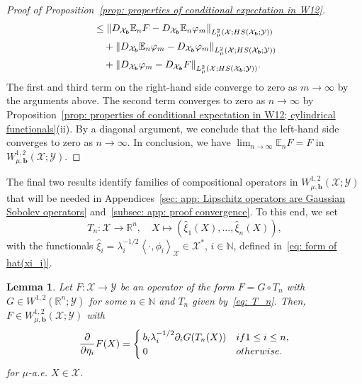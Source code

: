 \documentclass[namedate,webpdf]{ima-authoring-template-blank}
\newcommand*{\HS}{\textup{HS}}
\newcommand*{\nm}[1]{{\left\|#1\right \|}}
\newcommand*{\ip}[2]{\left\langle #1, #2 \right\rangle}
\newcounter{counter}
\numberwithin{counter}{section}
\numberwithin{equation}{section}
\theoremstyle{plain}
\newtheorem{lemma}[counter]{Lemma}
\theoremstyle{definition}
\newcommand*{\cX}{\mathcal{X}}
\newcommand*{\cY}{\mathcal{Y}}
\newcommand*{\bbE}{\mathbb{E}}
\newcommand*{\bbN}{\mathbb{N}}
\newcommand*{\bbR}{\mathbb{R}}
\theoremstyle{thmstyletwo}
\begin{document}
\begin{proof}[Proof of Proposition~\ref{prop: properties of conditional expectation in W12}]
\begin{align*}
        &\leq \nm{D_{\cX_{\bm{b}}} \bbE_n F - D_{\cX_{\bm{b}}} \bbE_n \varphi_m}_{L_{\mu}^2(\cX; \HS(\cX_{\bm{b}}; \cY))} \\
        &\quad + \nm{D_{\cX_{\bm{b}}} \bbE_n \varphi_m - D_{\cX_{\bm{b}}} \varphi_m}_{L_{\mu}^2(\cX; \HS(\cX_{\bm{b}}; \cY))} \\
        &\quad + \nm{D_{\cX_{\bm{b}}} \varphi_m - D_{\cX_{\bm{b}}} F}_{L_{\mu}^2(\cX; \HS(\cX_{\bm{b}}; \cY))}.
    \end{align*}
    The first and third term on the right-hand side converge to zero as \( m \to \infty \) by the arguments above. The second term converges to zero as \( n \to \infty \) by Proposition~\ref{prop: properties of conditional expectation in W12; cylindrical functionals}(ii). By a diagonal argument, we conclude that the left-hand side converges to zero as \( n \to \infty \). In conclusion, we have \( \lim_{n \to \infty} \bbE_n F = F \) in \( W_{\mu, \bm{b}}^{1,2}(\cX; \cY) \).
\end{proof}

The final two results identify families of compositional operators in \( W^{1,2}_{\mu, \bm{b}}(\cX; \cY) \) that will be needed in Appendices~\ref{sec: app: Lipschitz operators are Gaussian Sobolev operators} and~\ref{subsec: app: proof convergence}. To this end, we set 
\begin{equation}
\label{eq: T_n}
    T_n : \cX \to \bbR^n, \quad X \mapsto (\hat{\xi}_1(X), \dots, \hat{\xi}_n(X)),
\end{equation}
with the functionals \(\hat{\xi}_i = \lambda_i^{-1/2} \ip{\cdot}{\phi_i}_{\cX} \in \cX^*\), \( i \in \bbN \), defined in~\eqref{eq: form of hat(xi_i)}.
\begin{lemma}
\label{lem: Lebesgue Sobolev to Gaussian Sobolev}
    Let \(F : \cX \to \cY\) be an operator of the form
    \(
    F = G \circ T_n
    \)
    with \(G \in  W^{1,2}(\bbR^n; \cY)\) for some \(n \in \bbN\) and \( T_n \) given by~\eqref{eq: T_n}.
    Then, \(F \in W_{\mu, \bm{b}}^{1,2}(\cX; \cY)\) with
    \[
    \frac{\partial}{\partial \eta_i} F(X) =
    \begin{cases}
        b_i \lambda_i^{-1/2} \partial_i G(T_n(X)) & \textup{ if } 1 \leq i \leq n, \\
        0 & \textup{ otherwise.}
    \end{cases}
    \]
    for \( \mu \)-a.e. \( X \in \cX \).
\end{lemma}
\end{document}
